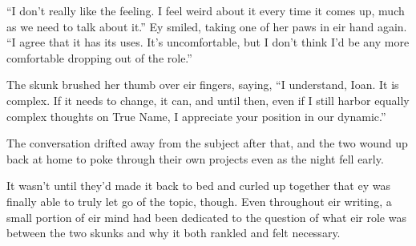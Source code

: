 ``I don't really like the feeling. I feel weird about it every time it comes up, much as we need to talk about it.'' Ey smiled, taking one of her paws in eir hand again. ``I agree that it has its uses. It's uncomfortable, but I don't think I'd be any more comfortable dropping out of the role.''

The skunk brushed her thumb over eir fingers, saying, ``I understand, Ioan. It is complex. If it needs to change, it can, and until then, even if I still harbor equally complex thoughts on True Name, I appreciate your position in our dynamic.''

The conversation drifted away from the subject after that, and the two wound up back at home to poke through their own projects even as the night fell early.

It wasn't until they'd made it back to bed and curled up together that ey was finally able to truly let go of the topic, though. Even throughout eir writing, a small portion of eir mind had been dedicated to the question of what eir role was between the two skunks and why it both rankled and felt necessary.
